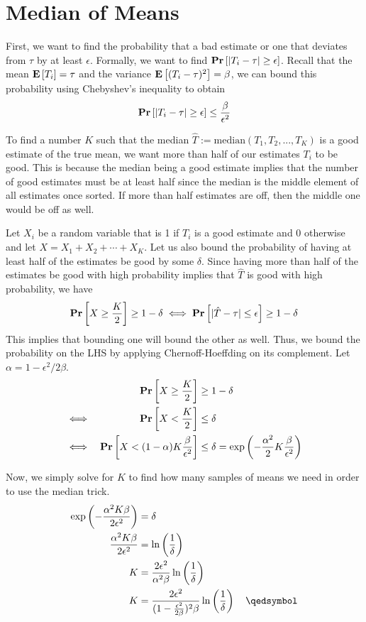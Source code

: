 \chapter{Median of Means}

First, we want to find the probability that a bad estimate or one that deviates from $\tau$ by at least $\epsilon$. Formally, we want to find $\mathbf{Pr}\left[|T_i - \tau| \geq \epsilon\right]$. Recall that the mean $\mathbf{E}\left[T_i\right] = \tau$ and the variance $\mathbf{E}\left[(T_i - \tau)^2\right] = \beta$, we can bound this probability using Chebyshev's inequality to obtain
\[ \mathbf{Pr}\left[|T_i - \tau| \geq \epsilon\right] \leq \frac{\beta}{\epsilon^2} \]

To find a number $K$ such that the median $\hat{T} := \text{median}(T_1, T_2, ..., T_K)$ is a good estimate of the true mean, we want more than half of our estimates $T_i$ to be good. This is because the median being a good estimate implies that the number of good estimates must be at least half since the median is the middle element of all estimates once sorted. If more than half estimates are off, then the middle one would be off as well.

Let $X_i$ be a random variable that is 1 if $T_i$ is a good estimate and 0 otherwise and let $X = X_1 + X_2 + \cdots + X_K$. Let us also bound the probability of having at least half of the estimates be good by some $\delta$. Since having more than half of the estimates be good with high probability implies that $\hat{T}$ is good with high probability, we have
\[ \mathbf{Pr}\left[X \geq \frac{K}{2}\right] \geq 1 - \delta \iff \mathbf{Pr}\left[|\hat{T} - \tau| \leq \epsilon\right] \geq 1 - \delta \]
This implies that bounding one will bound the other as well. Thus, we bound the probability on the LHS by applying Chernoff-Hoeffding on its complement. Let $\alpha = 1 - \epsilon^2/2\beta$.
\begin{equation*}
\begin{aligned}
	&& \mathbf{Pr}\left[X \geq \frac{K}{2}\right] &\geq 1 - \delta \\
	\iff && \mathbf{Pr}\left[X < \frac{K}{2}\right] &\leq \delta \\
	\iff && \mathbf{Pr}\left[X < (1 - \alpha)K\frac{\beta}{\epsilon^2}\right] &\leq \delta = \exp\left(-\frac{\alpha^2}{2}K\frac{\beta}{\epsilon^2}\right)
\end{aligned}
\end{equation*}

Now, we simply solve for $K$ to find how many samples of means we need in order to use the median trick.
\[
\begin{aligned}
	\exp\left(-\frac{\alpha^2K\beta}{2\epsilon^2}\right) &= \delta \\
	\frac{\alpha^2K\beta}{2\epsilon^2} &= \ln\left(\frac{1}{\delta}\right) \\
	K &= \frac{2\epsilon^2}{\alpha^2\beta}\ln\left(\frac{1}{\delta}\right) \\
	K &= \frac{2\epsilon^2}{(1 - \frac{\epsilon^2}{2\beta})^2\beta}\ln\left(\frac{1}{\delta}\right) \quad \qedsymbol
\end{aligned}
\]
